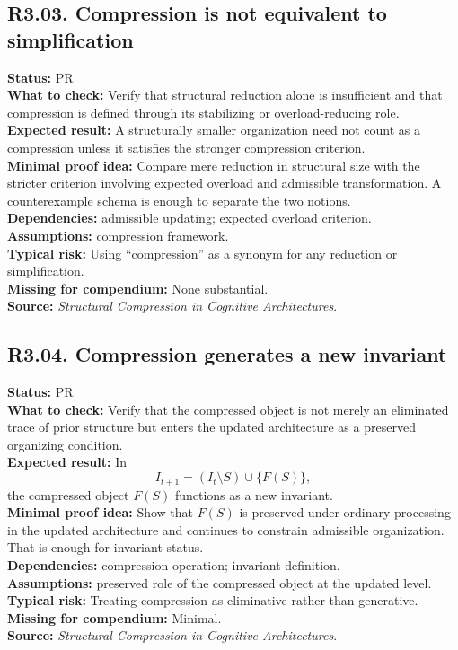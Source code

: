 \documentclass[12pt]{article}
\begin{document}
	\subsection*{R3.03. Compression is not equivalent to simplification}
	\textbf{Status:} PR \\
	\textbf{What to check:} Verify that structural reduction alone is insufficient and that compression is defined through its stabilizing or overload-reducing role. \\
	\textbf{Expected result:} A structurally smaller organization need not count as a compression unless it satisfies the stronger compression criterion. \\
	\textbf{Minimal proof idea:} Compare mere reduction in structural size with the stricter criterion involving expected overload and admissible transformation. A counterexample schema is enough to separate the two notions. \\
	\textbf{Dependencies:} admissible updating; expected overload criterion. \\
	\textbf{Assumptions:} compression framework. \\
	\textbf{Typical risk:} Using ``compression'' as a synonym for any reduction or simplification. \\
	\textbf{Missing for compendium:} None substantial. \\
	\textbf{Source:} \emph{Structural Compression in Cognitive Architectures}.
	
	\subsection*{R3.04. Compression generates a new invariant}
	\textbf{Status:} PR \\
	\textbf{What to check:} Verify that the compressed object is not merely an eliminated trace of prior structure but enters the updated architecture as a preserved organizing condition. \\
	\textbf{Expected result:} In
	\[
	I_{t+1}=(I_t\setminus S)\cup\{F(S)\},
	\]
	the compressed object $F(S)$ functions as a new invariant. \\
	\textbf{Minimal proof idea:} Show that $F(S)$ is preserved under ordinary processing in the updated architecture and continues to constrain admissible organization. That is enough for invariant status. \\
	\textbf{Dependencies:} compression operation; invariant definition. \\
	\textbf{Assumptions:} preserved role of the compressed object at the updated level. \\
	\textbf{Typical risk:} Treating compression as eliminative rather than generative. \\
	\textbf{Missing for compendium:} Minimal. \\
	\textbf{Source:} \emph{Structural Compression in Cognitive Architectures}.
	
\end{document}
